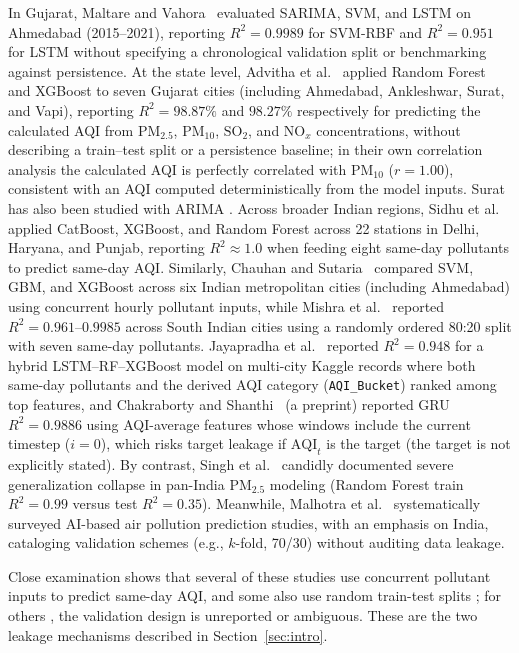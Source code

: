 In Gujarat, Maltare and Vahora~\cite{maltare2023} evaluated SARIMA, SVM, and LSTM on Ahmedabad (2015--2021), reporting $R^2 = 0.9989$ for SVM-RBF and $R^2 = 0.951$ for LSTM without specifying a chronological validation split or benchmarking against persistence. At the state level, Advitha et al.~\cite{advitha2024} applied Random Forest and XGBoost to seven Gujarat cities (including Ahmedabad, Ankleshwar, Surat, and Vapi), reporting $R^2 = 98.87\%$ and $98.27\%$ respectively for predicting the calculated AQI from $\text{PM}_{2.5}$, $\text{PM}_{10}$, $\text{SO}_2$, and $\text{NO}_x$ concentrations, without describing a train--test split or a persistence baseline; in their own correlation analysis the calculated AQI is perfectly correlated with $\text{PM}_{10}$ ($r = 1.00$), consistent with an AQI computed deterministically from the model inputs. Surat has also been studied with ARIMA \cite{mahendra2023}. Across broader Indian regions, Sidhu et al.~\cite{sidhu2024} applied CatBoost, XGBoost, and Random Forest across 22 stations in Delhi, Haryana, and Punjab, reporting $R^2 \approx 1.0$ when feeding eight same-day pollutants to predict same-day AQI. Similarly, Chauhan and Sutaria~\cite{chauhan2026} compared SVM, GBM, and XGBoost across six Indian metropolitan cities (including Ahmedabad) using concurrent hourly pollutant inputs, while Mishra et al.~\cite{mishra2025} reported $R^2 = 0.961\text{--}0.9985$ across South Indian cities using a randomly ordered 80:20 split with seven same-day pollutants. Jayapradha et al.~\cite{jayapradha2025} reported $R^2 = 0.948$ for a hybrid LSTM--RF--XGBoost model on multi-city Kaggle records where both same-day pollutants and the derived AQI category (\texttt{AQI\_Bucket}) ranked among top features, and Chakraborty and Shanthi~\cite{chakraborty2026} (a preprint) reported GRU $R^2 = 0.9886$ using AQI-average features whose windows include the current timestep ($i=0$), which risks target leakage if $\text{AQI}_t$ is the target (the target is not explicitly stated). By contrast, Singh et al.~\cite{singh2025} candidly documented severe generalization collapse in pan-India $\text{PM}_{2.5}$ modeling (Random Forest train $R^2 = 0.99$ versus test $R^2 = 0.35$). Meanwhile, Malhotra et al.~\cite{malhotra2024} systematically surveyed AI-based air pollution prediction studies, with an emphasis on India, cataloging validation schemes (e.g., $k$-fold, 70/30) without auditing data leakage.

Close examination shows that several of these studies \cite{sidhu2024}\cite{mishra2025}\cite{jayapradha2025}\cite{chauhan2026}\cite{advitha2024} use concurrent pollutant inputs to predict same-day AQI, and some also use random train-test splits \cite{mishra2025}; for others \cite{maltare2023}\cite{advitha2024}\cite{chakraborty2026}, the validation design is unreported or ambiguous. These are the two leakage mechanisms described in Section~\ref{sec:intro}.

